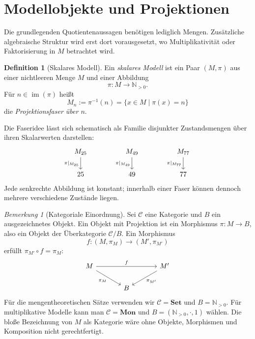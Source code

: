 \documentclass[11pt,a4paper,reqno]{amsart}
\theoremstyle{definition}
\newtheorem{definition}[theorem]{Definition}
\theoremstyle{remark}
\newtheorem{remark}[theorem]{Bemerkung}
\newcommand{\Npos}{\mathbb{N}_{>0}}
\newcommand{\im}{\operatorname{im}}
\begin{document}
\section{Modellobjekte und Projektionen}

Die grundlegenden Quotientenaussagen benötigen lediglich Mengen. Zusätzliche algebraische Struktur wird erst dort vorausgesetzt, wo Multiplikativität oder Faktorisierung in $M$ betrachtet wird.

\begin{definition}[Skalares Modell]
Ein \emph{skalares Modell} ist ein Paar $(M,\pi)$ aus einer nichtleeren Menge $M$ und einer Abbildung
\[
  \pi\colon M\longrightarrow\Npos.
\]
Für $n\in\im(\pi)$ heißt
\[
  M_n:=\pi^{-1}(n)=\{x\in M\mid \pi(x)=n\}
\]
die \emph{Projektionsfaser über $n$}.
\end{definition}

Die Faseridee lässt sich schematisch als Familie disjunkter Zustandsmengen über ihren Skalarwerten darstellen:
\[
\begin{tikzcd}[column sep=huge]
M_{25} \arrow[d,"\pi|_{M_{25}}"'] &
M_{49} \arrow[d,"\pi|_{M_{49}}"'] &
M_{77} \arrow[d,"\pi|_{M_{77}}"']\\
25 & 49 & 77
\end{tikzcd}
\]
Jede senkrechte Abbildung ist konstant; innerhalb einer Faser können dennoch mehrere verschiedene Zustände liegen.

\begin{remark}[Kategoriale Einordnung]
Sei $\mathcal C$ eine Kategorie und $B$ ein ausgezeichnetes Objekt. Ein Objekt mit Projektion ist ein Morphismus $\pi\colon M\to B$, also ein Objekt der Überkategorie $\mathcal C/B$. Ein Morphismus
\[
  f\colon(M,\pi_M)\longrightarrow(M',\pi_{M'})
\]
erfüllt $\pi_{M'}\circ f=\pi_M$:
\[
\begin{tikzcd}[column sep=large]
M \arrow[rr,"f"] \arrow[dr,"\pi_M"'] && M' \arrow[dl,"\pi_{M'}"]\\
& B &
\end{tikzcd}
\]
Für die mengentheoretischen Sätze verwenden wir $\mathcal C=\mathbf{Set}$ und $B=\Npos$. Für multiplikative Modelle kann man $\mathcal C=\mathbf{Mon}$ und $B=(\Npos,\cdot,1)$ wählen. Die bloße Bezeichnung von $M$ als Kategorie wäre ohne Objekte, Morphismen und Komposition nicht gerechtfertigt.
\end{remark}
\end{document}
